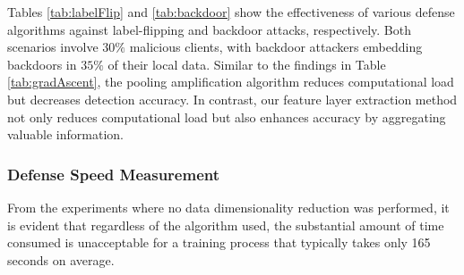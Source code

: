 \documentclass[conference]{IEEEtran}
\begin{document}
Tables \hyperref[tab:labelFlip]{\ref{tab:labelFlip}} and \hyperref[tab:backdoor]{\ref{tab:backdoor}} show the effectiveness of various defense algorithms against label-flipping and backdoor attacks, respectively. Both scenarios involve $30\%$ malicious clients, with backdoor attackers embedding backdoors in $35\%$ of their local data. Similar to the findings in Table \hyperref[tab:gradAscent]{\ref{tab:gradAscent}}, the pooling amplification algorithm reduces computational load but decreases detection accuracy. In contrast, our feature layer extraction method not only reduces computational load but also enhances accuracy by aggregating valuable information.


\subsubsection{\textbf{Defense Speed Measurement}}






From the experiments where no data dimensionality reduction was performed, it is evident that regardless of the algorithm used, the substantial amount of time consumed is unacceptable for a training process that typically takes only 165 seconds on average.
\end{document}
